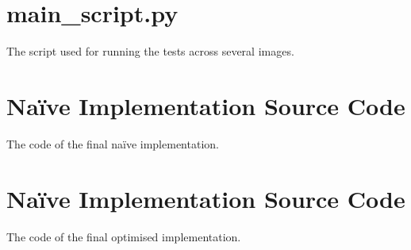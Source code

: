 \chapter{main_script.py}
\label{AppMain} 

The script used for running the tests across several images. 




\chapter{Na\"ive Implementation Source Code}
\label{AppNaive} 

The code of the final na\"ive implementation. 



\chapter{Na\"ive Implementation Source Code}
\label{AppOpt} 

The code of the final optimised implementation. 








